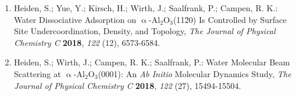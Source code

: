 \documentclass[11pt,DIV=13,BCOR=5mm,a4paper,headinclude]{scrbook}
\begin{document}

\begin{enumerate}[itemsep=0.25\baselineskip]
  \item Heiden, S.; Yue, Y.; Kirsch, H.; Wirth, J.; Saalfrank, P.; Campen, R. K.: {\frqq}Water Dissociative Adsorption on $\upalpha$-Al$_2$O$_3$(11\=20) Is Controlled by Surface Site Undercoordination, Density, and Topology{\flqq}, \textit{The Journal of Physical Chemistry C} \textbf{2018}, \textit{122} (12), 6573-6584.
  \item Heiden, S.; Wirth, J.; Campen, R. K.; Saalfrank, P.: {\frqq}Water Molecular Beam Scattering at $\upalpha$-Al$_2$O$_3$(0001): An \textit{Ab Initio} Molecular Dynamics Study{\flqq}, \textit{The Journal of Physical Chemistry C} \textbf{2018}, \textit{122} (27), 15494-15504.

\end{enumerate}
\end{document}
